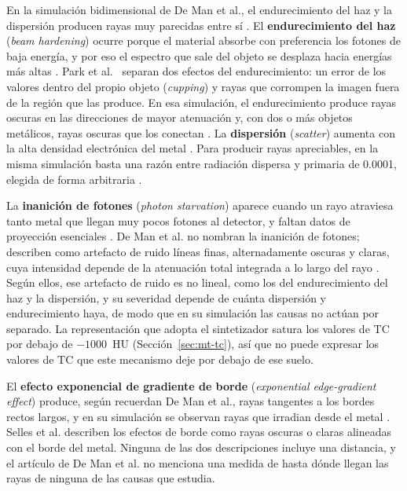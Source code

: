 En la simulación bidimensional de De Man et al., el endurecimiento del haz y la dispersión producen rayas muy parecidas entre sí \cite{deman1999}. El \textbf{endurecimiento del haz} (\emph{beam hardening}) ocurre porque el material absorbe con preferencia los fotones de baja energía, y por eso el espectro que sale del objeto se desplaza hacia energías más altas \cite{selles2024marreview}. Park et al.~\cite{park2015ct} separan dos efectos del endurecimiento: un error de los valores dentro del propio objeto (\emph{cupping}) y rayas que corrompen la imagen fuera de la región que las produce. En esa simulación, el endurecimiento produce rayas oscuras en las direcciones de mayor atenuación y, con dos o más objetos metálicos, rayas oscuras que los conectan \cite{deman1999}. La \textbf{dispersión} (\emph{scatter}) aumenta con la alta densidad electrónica del metal \cite{selles2024marreview}. Para producir rayas apreciables, en la misma simulación basta una razón entre radiación dispersa y primaria de 0.0001, elegida de forma arbitraria \cite{deman1999}.

La \textbf{inanición de fotones} (\emph{photon starvation}) aparece cuando un rayo atraviesa tanto metal que llegan muy pocos fotones al detector, y faltan datos de proyección esenciales \cite{selles2024marreview}. De Man et al. no nombran la inanición de fotones; describen como artefacto de ruido líneas finas, alternadamente oscuras y claras, cuya intensidad depende de la atenuación total integrada a lo largo del rayo \cite{deman1999}. Según ellos, ese artefacto de ruido es no lineal, como los del endurecimiento del haz y la dispersión, y su severidad depende de cuánta dispersión y endurecimiento haya, de modo que en su simulación las causas no actúan por separado. La representación que adopta el sintetizador satura los valores de TC por debajo de $-1000$~HU (Sección~\ref{sec:mt-tc}), así que no puede expresar los valores de TC que este mecanismo deje por debajo de ese suelo.

El \textbf{efecto exponencial de gradiente de borde} (\emph{exponential edge-gradient effect}) produce, según recuerdan De Man et al., rayas tangentes a los bordes rectos largos, y en su simulación se observan rayas que irradian desde el metal \cite{deman1999}. Selles et al. describen los efectos de borde como rayas oscuras o claras alineadas con el borde del metal. Ninguna de las dos descripciones incluye una distancia, y el artículo de De Man et al. no menciona una medida de hasta dónde llegan las rayas de ninguna de las causas que estudia.

